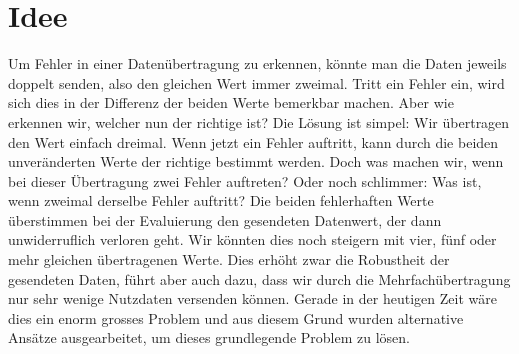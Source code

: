 %
%
\section{Idee
\label{reedsolomon:section:idee}}
Um Fehler in einer Datenübertragung zu erkennen, könnte man die Daten jeweils doppelt senden,
also den gleichen Wert immer zweimal. 
Tritt ein Fehler ein, wird sich dies in der Differenz der beiden Werte bemerkbar machen.
Aber wie erkennen wir, welcher nun der richtige ist? Die Lösung ist simpel: Wir übertragen den Wert einfach dreimal.
Wenn jetzt ein Fehler auftritt, kann durch die beiden unveränderten Werte der richtige bestimmt werden.
Doch was machen wir, wenn bei dieser Übertragung zwei Fehler auftreten? 
Oder noch schlimmer: Was ist, wenn zweimal derselbe Fehler auftritt? Die beiden fehlerhaften Werte überstimmen bei der Evaluierung den gesendeten Datenwert, der dann unwiderruflich verloren geht. 
Wir könnten dies noch steigern mit vier, fünf oder mehr gleichen übertragenen Werte. Dies erhöht zwar die Robustheit der gesendeten Daten, führt aber auch dazu, dass wir durch die Mehrfachübertragung nur sehr wenige Nutzdaten versenden können.
Gerade in der heutigen Zeit wäre dies ein enorm grosses Problem und aus diesem Grund wurden alternative Ansätze ausgearbeitet, um dieses grundlegende Problem zu lösen. 
%
%
%
%
%
%
%
%
%
%
% 
%
%
%
%
%

